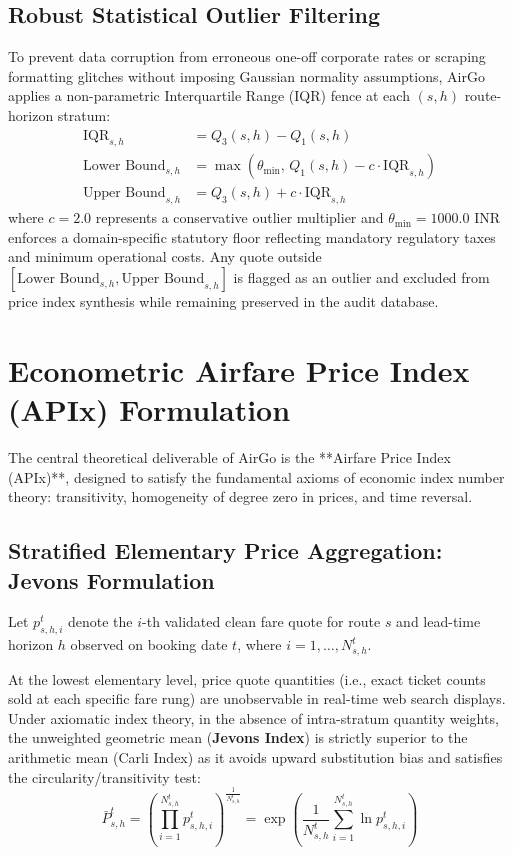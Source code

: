 \documentclass[11pt,a4paper]{article}
\begin{document}
\subsection{Robust Statistical Outlier Filtering}
To prevent data corruption from erroneous one-off corporate rates or scraping formatting glitches without imposing Gaussian normality assumptions, AirGo applies a non-parametric Interquartile Range (IQR) fence at each $(s, h)$ route-horizon stratum:
\begin{align}
\text{IQR}_{s,h} &= Q_3(s, h) - Q_1(s, h) \\
\text{Lower Bound}_{s,h} &= \max\left(\theta_{\min}, \, Q_1(s, h) - c \cdot \text{IQR}_{s,h}\right) \\
\text{Upper Bound}_{s,h} &= Q_3(s, h) + c \cdot \text{IQR}_{s,h}
\end{align}
where $c = 2.0$ represents a conservative outlier multiplier and $\theta_{\min} = 1000.0$ INR enforces a domain-specific statutory floor reflecting mandatory regulatory taxes and minimum operational costs. Any quote outside $[\text{Lower Bound}_{s,h}, \text{Upper Bound}_{s,h}]$ is flagged as an outlier and excluded from price index synthesis while remaining preserved in the audit database.

\section{Econometric Airfare Price Index (APIx) Formulation}
\label{sec:index_theory}

The central theoretical deliverable of AirGo is the **Airfare Price Index (APIx)**, designed to satisfy the fundamental axioms of economic index number theory: transitivity, homogeneity of degree zero in prices, and time reversal.

\subsection{Stratified Elementary Price Aggregation: Jevons Formulation}
Let $p_{s,h,i}^t$ denote the $i$-th validated clean fare quote for route $s$ and lead-time horizon $h$ observed on booking date $t$, where $i = 1, \dots, N_{s,h}^t$.

At the lowest elementary level, price quote quantities (i.e., exact ticket counts sold at each specific fare rung) are unobservable in real-time web search displays. Under axiomatic index theory, in the absence of intra-stratum quantity weights, the unweighted geometric mean (\textbf{Jevons Index}) is strictly superior to the arithmetic mean (Carli Index) as it avoids upward substitution bias and satisfies the circularity/transitivity test:
\begin{equation}
\label{eq:jevons_elementary}
\bar{P}_{s,h}^t = \left( \prod_{i=1}^{N_{s,h}^t} p_{s,h,i}^t \right)^{\frac{1}{N_{s,h}^t}} = \exp\left( \frac{1}{N_{s,h}^t} \sum_{i=1}^{N_{s,h}^t} \ln p_{s,h,i}^t \right)
\end{equation}
\end{document}
